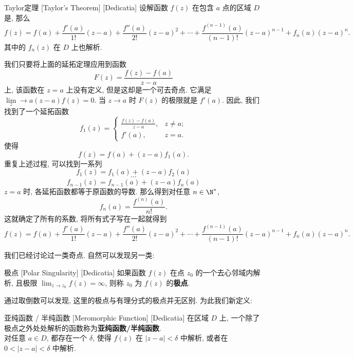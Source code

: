 \documentclass[UTF8]{ctexart}
\begin{document}
        \begin{thm}
            [Taylor]
            {Taylor定理\label{thm:Taylor}}
            [Taylor's Theorem]
            [Dedicatia]
            设解函数 \(f(z)\) 在包含 \(a\) 点的区域 \(D\) 是, 那么
            \[f(z)=f(a)+\frac{f'(a)}{1!}(z-a)+\frac{f''(a)}{2!}(z-a)^2+\cdots+\frac{f^{(n-1)}(a)}{(n-1)!}(z-a)^{n-1}+f_n(a)(z-a)^n.\]
            其中的 \(f_n(z)\) 在 \(D\) 上也解析. 
        \end{thm}

        \begin{prf}
            我们只要将上面的延拓定理应用到函数
            \[F(z)=\frac{f(z)-f(a)}{z-a}\]
            上, 该函数在 \(z=a\) 上没有定义, 但是这却是一个可去奇点. 它满足 \(\lim\limits_z\to a(z-a)f(z)=0\). 当 \(z\to a\) 时 \(F(z)\) 的极限就是 \(f'(a)\). 因此, 我们找到了一个延拓函数
            \[f_1(z)=\begin{cases}
                \frac{f(z)-f(a)}{z-a}, & z\neq a;\\
                f'(a), &z=a.
            \end{cases}\]
            使得
            \[f(z)=f(a)+(z-a)f_1(a).\]
            重复上述过程, 可以找到一系列
            \[f_1(z)=f_1(a)+(z-a)f_2(a)\]
            \[\cdots\]
            \[f_{n-1}(z)=f_{n-1}(a)+(z-a)f_n(a)\]
            \(z=a\) 时, 各延拓函数都等于原函数的导数. 那么得到对任意 \(n\in\N^*\),
            \[f_n(a)=\frac{f^{(n)}(a)}{n!}.\]
            这就确定了所有的系数, 将所有式子写在一起就得到
            \[f(z)=f(a)+\frac{f'(a)}{1!}(z-a)+\frac{f''(a)}{2!}(z-a)^2+\cdots+\frac{f^{(n-1)}(a)}{(n-1)!}(z-a)^{n-1}+f_n(a)(z-a)^n.\]
        \end{prf}

        我们已经讨论过一类奇点. 自然可以发现另一类: 

        \begin{dfn}
            [PolarSingularity]
            {极点}
            [Polar Singularity]
            [Dedicatia]
            如果函数 \(f(z)\) 在点 \(z_0\) 的一个去心邻域内解析, 且极限 \(\lim_{z \to z_0} f(z) = \infty\), 则称 \(z_0\) 为 \(f(z)\) 的\textbf{极点}. 
        \end{dfn}

        通过取倒数可以发现, 这里的极点与有理分式的极点并无区别. 为此我们新定义: 

        \begin{dfn}
            [MeromorphicFunction]
            {亚纯函数 / 半纯函数}
            [Meromorphic Function]
            [Dedicatia]
            在区域 \(D\) 上, 一个除了极点之外处处解析的函数称为\textbf{亚纯函数/半纯函数}.\\
            对任意 \(a\in D\), 都存在一个 \(\delta\), 使得 \(f(z)\) 在 \(|z-a|<\delta\) 中解析, 或者在 \(0<|z-a|<\delta\) 中解析. 
        \end{dfn}
\end{document}
